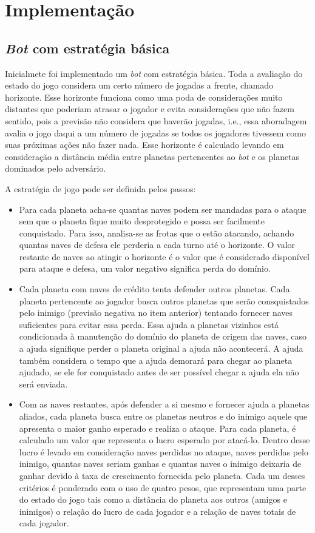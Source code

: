 \documentclass[a4paper,titlepage,11pt]{article}
\begin{document}
\section{Implementação}
\label{seq:Implementação}


\subsection{{\em Bot} com estratégia básica}
Inicialmete foi implementado um {\em bot} com estratégia básica. Toda a avaliação do estado do jogo considera um certo número de jogadas a frente, chamado horizonte. Esse horizonte funciona como uma poda de considerações muito distantes que poderiam atrasar o jogador e evita considerações que não fazem sentido, pois a previsão não considera que haverão jogadas, i.e., essa aboradagem avalia o jogo daqui a um número de jogadas se todos os jogadores tivessem como suas próximas ações não fazer nada. Esse horizonte é calculado levando em consideração a distância média entre planetas pertencentes ao {\em bot} e os planetas dominados pelo adversário.

A estratégia de jogo pode ser definida pelos passos:

\begin{itemize}
	\item Para cada planeta acha-se quantas naves podem ser mandadas para o ataque sem que o planeta fique muito 		desprotegido e possa ser facilmente conquistado. 
Para isso, analisa-se as frotas que o estão atacando, achando quantas naves de defesa ele perderia a cada turno até o horizonte. O valor restante de naves ao atingir o horizonte é o valor que é considerado disponível para ataque e defesa, um valor negativo significa perda do domínio.
	\item Cada planeta com naves de crédito tenta defender outros planetas.
Cada planeta pertencente ao jogador busca outros planetas que serão consquistados pelo inimigo (previsão negativa no item anterior) tentando fornecer naves suficientes para evitar essa perda. Essa ajuda a planetas vizinhos está condicionada à manutenção do domínio do planeta de origem das naves, caso a ajuda signifique perder o planeta original a ajuda não acontecerá. A ajuda também considera o tempo que a ajuda demorará para chegar ao planeta ajudado, se ele for conquistado antes de ser possível chegar a ajuda ela não será enviada.
	\item Com as naves restantes, após defender a si mesmo e fornecer ajuda a planetas aliados, cada planeta busca entre os planetas neutros e do inimigo aquele que apresenta o maior ganho esperado e realiza o ataque.
Para cada planeta, é calculado um valor que representa o lucro esperado por atacá-lo. Dentro desse lucro é levado em consideração naves perdidas no ataque, naves perdidas pelo inimigo, quantas naves seriam ganhas e quantas naves o inimigo deixaria de ganhar devido à taxa de crescimento fornecida pelo planeta. Cada um desses critérios é ponderado com o uso de quatro pesos, que representam uma parte do estado do jogo tais como a distância do planeta aos outros (amigos e inimigos) o relação do lucro de cada jogador e a relação de naves totais de cada jogador.
\end{itemize}
\end{document}
